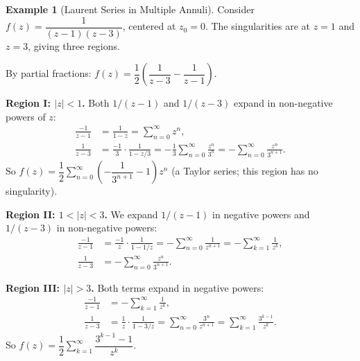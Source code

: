 \documentclass[12pt,a4paper,openany]{book}
\theoremstyle{definition}
\newtheorem{example}[definition]{Example}
\theoremstyle{plain}
\theoremstyle{remark}
\newcommand{\abs}[1]{\left|#1\right|}
\begin{document}
\begin{example}[Laurent Series in Multiple Annuli]\label{ex:laurent-multiple-annuli}
Consider $f(z)=\dfrac{1}{(z-1)(z-3)}$, centered at $z_0=0$. The singularities are
at $z=1$ and $z=3$, giving three regions.

By partial fractions: $f(z)=\dfrac{1}{2}\left(\dfrac{1}{z-3}-\dfrac{1}{z-1}\right)$.

\medskip\noindent
\textbf{Region I: $\abs{z}<1$.} Both $1/(z-1)$ and $1/(z-3)$ expand in non-negative
powers of $z$:
\begin{align*}
  \frac{-1}{z-1} &= \frac{1}{1-z} = \sum_{n=0}^{\infty}z^n, \\
  \frac{1}{z-3} &= \frac{-1}{3}\cdot\frac{1}{1-z/3}
  = -\frac{1}{3}\sum_{n=0}^{\infty}\frac{z^n}{3^n}
  = -\sum_{n=0}^{\infty}\frac{z^n}{3^{n+1}}.
\end{align*}
So $f(z)=\dfrac{1}{2}\sum_{n=0}^{\infty}\left(-\dfrac{1}{3^{n+1}}-1\right)z^n$
(a Taylor series; this region has no singularity).

\medskip\noindent
\textbf{Region II: $1<\abs{z}<3$.} We expand $1/(z-1)$ in negative powers and
$1/(z-3)$ in non-negative powers:
\begin{align*}
  \frac{-1}{z-1} &= \frac{-1}{z}\cdot\frac{1}{1-1/z}
  = -\sum_{n=0}^{\infty}\frac{1}{z^{n+1}}
  = -\sum_{k=1}^{\infty}\frac{1}{z^k}, \\
  \frac{1}{z-3} &= -\sum_{n=0}^{\infty}\frac{z^n}{3^{n+1}}.
\end{align*}

\medskip\noindent
\textbf{Region III: $\abs{z}>3$.} Both terms expand in negative powers:
\begin{align*}
  \frac{-1}{z-1} &= -\sum_{k=1}^{\infty}\frac{1}{z^k}, \\
  \frac{1}{z-3} &= \frac{1}{z}\cdot\frac{1}{1-3/z}
  = \sum_{n=0}^{\infty}\frac{3^n}{z^{n+1}}
  = \sum_{k=1}^{\infty}\frac{3^{k-1}}{z^k}.
\end{align*}
So $f(z) = \dfrac{1}{2}\sum_{k=1}^{\infty}\dfrac{3^{k-1}-1}{z^k}$.
\end{example}

\begin{center}
\end{center}
\end{document}
